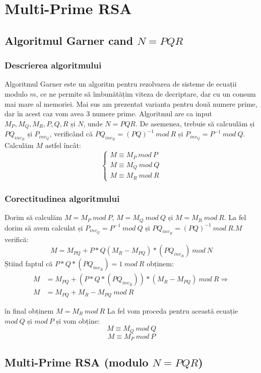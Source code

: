 \documentclass[12pt, oneside]{book}
\begin{document}
	    
	    \section{Multi-Prime RSA}
	     \subsection{Algoritmul Garner cand $N=PQR$}
	     \subsubsection{Descrierea algoritmului}
	     Algoritmul Garner este un algoritm pentru rezolvarea de sisteme de ecuații modulo $m$, ce ne permite să îmbunătățim viteza de decriptare, dar cu un consum mai mare al memoriei. Mai sus am prezentat varianta pentru două numere prime, dar în acest caz vom avea $3$ numere prime. Algoritmul are ca input $M_P,M_Q,M_R,P,Q,R$ și $N$, unde $N=PQR$. De asemenea, trebuie să calcuulăm și $PQ_{inv_R}$ și $P_{inv_Q}$, verificând că $PQ_{inv_R}=(PQ)^{-1} \ mod \ R$ și $P_{inv_Q}=P^{-1} \ mod \ Q$. Calculăm $M$ astfel încât: \\
	         \[
\left\{ 
\begin{array}{c}
M \equiv M_P \ mod \ P \\ 
M \equiv M_Q \ mod \ Q \\ 
M \equiv M_R \ mod \ R
\end{array}
\right. 
\]

		\subsubsection{Corectitudinea algoritmului}
		Dorim să calculăm $M=M_P \ mod \ P$, $M=M_Q \ mod \ Q $ și $M=M_R \ mod \ R $. La fel dorim să avem calculat și $P_{inv_Q}=P^{-1} \ mod  \ Q$ și $PQ_{inv_R}=(PQ)^{-1} \ mod \ R$.$ M$ verifică: 
		$$M=M_{PQ} + P*Q(M_R-M_{PQ})*(PQ_{inv_R}) \ mod \ N$$
		Știind faptul că  $P*Q*(PQ_{inv_R})=1 \ mod \ R$ obținem:
		\begin{align*}
	M&=M_{PQ}+(P*Q*(PQ_{inv_R}))*(M_R-M_{PQ}) \ mod \ R \Rightarrow \\
	M&=M_{PQ} + M_R - M_{PQ} \ mod \ R
		\end{align*}

		în final obținem $ M=M_R \ mod \ R $
		La fel vom proceda pentru această ecuație $mod \ Q$ și $mod \ P$ și vom obține:
		$$M \equiv M_Q \ mod \ Q$$
		$$M \equiv M_P \ mod \ P$$
		
		\subsection{Multi-Prime RSA (modulo $N=PQR$)}
\end{document}
